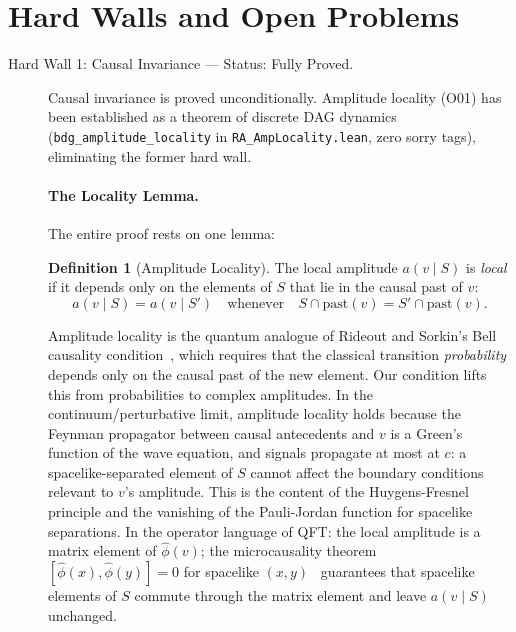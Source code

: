 \documentclass[11pt,a4paper]{article}
\theoremstyle{plain}
\theoremstyle{definition}
\newtheorem{definition}[theorem]{Definition}
\theoremstyle{remark}
\begin{document}
\section{Hard Walls and Open Problems}
\label{sec:hardwalls}

\begin{description}
  \item[Hard Wall 1: Causal Invariance --- Status: Fully Proved.]

  Causal invariance is proved unconditionally. Amplitude locality
  (O01) has been established as a theorem of discrete DAG dynamics
  (\texttt{bdg\_amplitude\_locality} in \texttt{RA\_AmpLocality.lean},
  zero sorry tags), eliminating the former hard wall.

  \paragraph{The Locality Lemma.}
  The entire proof rests on one lemma:

  \begin{definition}[Amplitude Locality]
  The local amplitude $a(v \mid S)$ is \emph{local} if it depends only on
  the elements of $S$ that lie in the causal past of $v$:
  \begin{equation}
    a(v \mid S) = a(v \mid S') \quad\text{whenever}\quad
    S \cap \mathrm{past}(v) = S' \cap \mathrm{past}(v).
    \label{eq:locality}
  \end{equation}
  \end{definition}

  Amplitude locality is the quantum analogue of Rideout and Sorkin's Bell
  causality condition~\citep{RideoutSorkin2000}, which requires that the
  classical transition \emph{probability} depends only on the causal past of
  the new element. Our condition lifts this from probabilities to complex
  amplitudes. In the continuum/perturbative limit, amplitude locality holds
  because the Feynman propagator between causal antecedents and $v$ is a
  Green's function of the wave equation, and signals propagate at most at $c$:
  a spacelike-separated element of $S$ cannot affect the boundary conditions
  relevant to $v$'s amplitude. This is the content of the Huygens-Fresnel
  principle and the vanishing of the Pauli-Jordan function for spacelike
  separations. In the operator language of QFT: the local amplitude is a
  matrix element of $\hat{\phi}(v)$; the microcausality theorem
  $[\hat{\phi}(x), \hat{\phi}(y)] = 0$ for spacelike $(x,y)$~\citep{Haag1996}
  guarantees that spacelike elements of $S$ commute through the matrix element
  and leave $a(v \mid S)$ unchanged.


\end{description}
\end{document}
